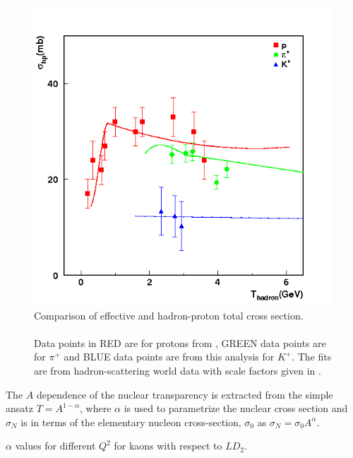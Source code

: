 \begin{figure}[!tbp]
  \centering
  \includegraphics[width=0.8\columnwidth]{crr2}
  \caption[Comparison of effective and hadron-proton total cross section.]{\label{fig:crr2}Comparison of effective and hadron-proton total cross section.\\\\ Data points in RED are for protons from \cite{hinton01}, GREEN data points are for $\pi^+$ and BLUE data points are from this analysis for $K^+$. The fits are from hadron-scattering world data\cite{PDG} with scale factors given in .}
\end{figure}

%
The $A$ dependence of the nuclear transparency is extracted from the simple ansatz $T = A^{1 - \alpha}$, where $\alpha$ is used to parametrize the nuclear cross section and $\sigma_N$ is in terms of the elementary nucleon cross-section, $\sigma_{0}$ as $\sigma_N = \sigma_0A^{\alpha}$.

\begin{table}
  \caption[$\alpha$ values for different $Q^2$ for kaons with respect to $LD_2$.]{\label{tab:alpha2}$\alpha$ values for different $Q^2$ for kaons with respect to $LD_2$.}

\end{table}

